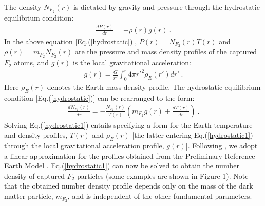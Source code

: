 \documentclass[12pt]{article}
\begin{document}
The density $N _{F_2}(r)$ is dictated by gravity and pressure through the hydrostatic equilibrium condition:
\begin{eqnarray}
\frac{dP(r)}{dr} = -\rho (r)g(r) \ .
\label{hydrostatic}
\end{eqnarray}
%
In the above equation [Eq.(\ref{hydrostatic})], $P(r) = N _{F_2}(r)T(r)$ and $\rho (r) = m _{F_2}N _{F_2}(r)$ are the pressure and mass density profiles of the captured $F_2$ atoms, and $g(r)$ is the local gravitational acceleration:
%
\begin{eqnarray}
g(r) = \frac{G}{r ^2}\int _0 ^r 4\pi {r'} ^2\rho _E (r') dr' \ .
\end{eqnarray}
%
Here $\rho _E(r)$ denotes the Earth mass density profile. The hydrostatic equilibrium condition [Eq.(\ref{hydrostatic})] can be rearranged to the form:
%
\begin{eqnarray}
\frac{dN _{F_2}(r)}{dr} = -\frac{N _{F_2}(r)}{T(r)}\left ( m _{F_2}g(r) + \frac{dT(r)}{dr} \right ) \ .
\label{hydrostatic1}
\end{eqnarray}
%
Solving Eq.(\ref{hydrostatic1}) entails specifying a form for the Earth temperature and density profiles, $T(r)$ and $\rho _E (r)$ [the latter entering
Eq.(\ref{hydrostatic1}) through the local gravitational acceleration profile, $g(r)$]. Following \cite{footdiurnal}, we adopt a linear approximation for the
profiles obtained from the Preliminary Reference Earth Model \cite{preliminary}. Eq.(\ref{hydrostatic1}) can now be solved to obtain the number density of
captured $F_2$ particles (some examples are shown in Figure 1). Note that the obtained number density profile depends only on the mass of the dark matter particle, $m _{F_2}$, and is independent of the other fundamental parameters.
\end{document}
